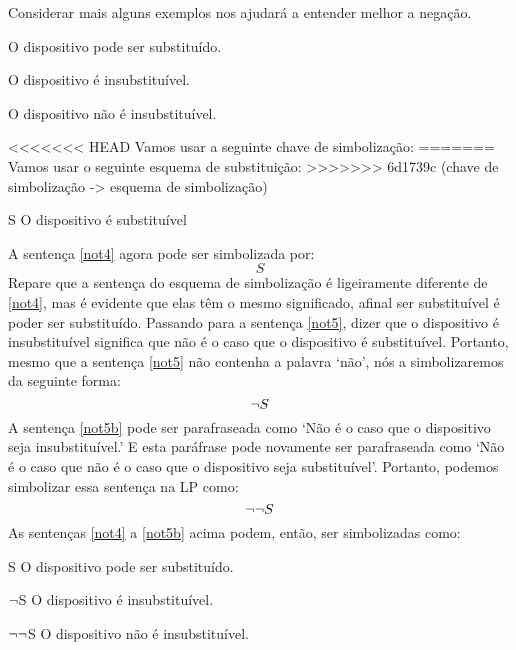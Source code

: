 \noindent Considerar mais alguns exemplos nos ajudará a entender melhor a negação.
	\begin{earg}
		\item[\ex{not4}] O dispositivo pode ser substituído.
		\item[\ex{not5}] O dispositivo é insubstituível.
		\item[\ex{not5b}] O dispositivo não é insubstituível.
	\end{earg}
<<<<<<< HEAD
Vamos usar a seguinte chave de simbolização:
=======
Vamos usar o seguinte esquema de substituição:
>>>>>>> 6d1739c (chave de simbolização -> esquema de simbolização)
	\begin{ekey}
		\item[S] O dispositivo é substituível
	\end{ekey}
A sentença \ref{not4} agora pode ser simbolizada por:
$$S$$
Repare que a sentença do esquema de simbolização é ligeiramente diferente de \ref{not4}, mas é evidente que elas têm o mesmo significado, afinal ser substituível é poder ser substituído.
Passando para a sentença \ref{not5}, dizer que o dispositivo é insubstituível significa que não é o caso que o dispositivo é substituível.
Portanto, mesmo que a sentença \ref{not5} não contenha a palavra `não', nós a simbolizaremos da seguinte forma: $$\neg S$$
A sentença \ref{not5b} pode ser parafraseada como `Não é o caso que o dispositivo seja insubstituível.'
E esta paráfrase pode novamente ser parafraseada como `Não é o caso que não é o caso que o dispositivo seja substituível'.
Portanto, podemos simbolizar essa sentença na LP como:
$$\neg\neg S$$
As sentenças \ref{not4} a \ref{not5b} acima podem, então, ser simbolizadas como:
	\begin{ekey}
		\item[S] O dispositivo pode ser substituído.
		\item[$\neg$S] O dispositivo é insubstituível.
		\item[$\neg\neg$S] O dispositivo não é insubstituível.
	\end{ekey}

